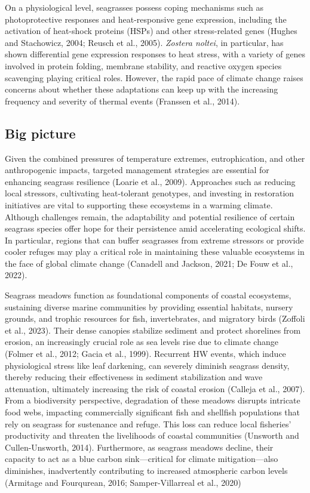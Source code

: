\documentclass[
  letterpaper,
  11pt,
  english,
  singlespacing,
  headsepline]{MastersDoctoralThesis}
\begin{document}
\begin{spacing}{1.5}
On a physiological level, seagrasses possess coping mechanisms such as
photoprotective responses and heat-responsive gene expression, including
the activation of heat-shock proteins (HSPs) and other stress-related
genes (Hughes and Stachowicz, 2004; Reusch et al., 2005). \emph{Zostera
noltei}, in particular, has shown differential gene expression responses
to heat stress, with a variety of genes involved in protein folding,
membrane stability, and reactive oxygen species scavenging playing
critical roles. However, the rapid pace of climate change raises
concerns about whether these adaptations can keep up with the increasing
frequency and severity of thermal events (Franssen et al., 2014).

\subsection{Big picture}\label{big-picture}

Given the combined pressures of temperature extremes, eutrophication,
and other anthropogenic impacts, targeted management strategies are
essential for enhancing seagrass resilience (Loarie et al., 2009).
Approaches such as reducing local stressors, cultivating heat-tolerant
genotypes, and investing in restoration initiatives are vital to
supporting these ecosystems in a warming climate. Although challenges
remain, the adaptability and potential resilience of certain seagrass
species offer hope for their persistence amid accelerating ecological
shifts. In particular, regions that can buffer seagrasses from extreme
stressors or provide cooler refuges may play a critical role in
maintaining these valuable ecosystems in the face of global climate
change (Canadell and Jackson, 2021; De Fouw et al., 2022).

Seagrass meadows function as foundational components of coastal
ecosystems, sustaining diverse marine communities by providing essential
habitats, nursery grounds, and trophic resources for fish,
invertebrates, and migratory birds (Zoffoli et al., 2023). Their dense
canopies stabilize sediment and protect shorelines from erosion, an
increasingly crucial role as sea levels rise due to climate change
(Folmer et al., 2012; Gacia et al., 1999). Recurrent HW events, which
induce physiological stress like leaf darkening, can severely diminish
seagrass density, thereby reducing their effectiveness in sediment
stabilization and wave attenuation, ultimately increasing the risk of
coastal erosion (Calleja et al., 2007). From a biodiversity perspective,
degradation of these meadows disrupts intricate food webs, impacting
commercially significant fish and shellfish populations that rely on
seagrass for sustenance and refuge. This loss can reduce local
fisheries' productivity and threaten the livelihoods of coastal
communities (Unsworth and Cullen-Unsworth, 2014). Furthermore, as
seagrass meadows decline, their capacity to act as a blue carbon
sink---critical for climate mitigation---also diminishes, inadvertently
contributing to increased atmospheric carbon levels (Armitage and
Fourqurean, 2016; Samper-Villarreal et al., 2020)


\end{spacing}
\end{document}
